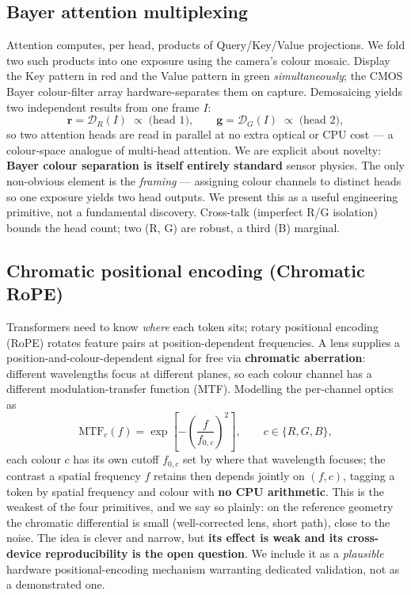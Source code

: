 \documentclass[11pt]{article}
\begin{document}
\subsection{Bayer attention multiplexing}
Attention computes, per head, products of Query/Key/Value projections. We fold two such
products into one exposure using the camera's colour mosaic. Display the Key pattern in red and
the Value pattern in green \emph{simultaneously}; the CMOS Bayer colour-filter array
hardware-separates them on capture. Demosaicing yields two independent results from one frame
$I$:
\begin{equation}
\mathbf{r} = \mathcal{D}_R(I)\;\propto\;\text{(head 1)}, \qquad
\mathbf{g} = \mathcal{D}_G(I)\;\propto\;\text{(head 2)},
\end{equation}
so two attention heads are read in parallel at no extra optical or CPU cost --- a colour-space
analogue of multi-head attention. We are explicit about novelty: \textbf{Bayer colour
separation is itself entirely standard} sensor physics. The only non-obvious element is the
\emph{framing} --- assigning colour channels to distinct heads so one exposure yields two head
outputs. We present this as a useful engineering primitive, not a fundamental discovery.
Cross-talk (imperfect R/G isolation) bounds the head count; two (R, G) are robust, a third (B)
marginal.

\subsection{Chromatic positional encoding (Chromatic RoPE)}
Transformers need to know \emph{where} each token sits; rotary positional encoding (RoPE)
rotates feature pairs at position-dependent frequencies. A lens supplies a
position-and-colour-dependent signal for free via \textbf{chromatic aberration}: different
wavelengths focus at different planes, so each colour channel has a different
modulation-transfer function (MTF). Modelling the per-channel optics as
\begin{equation}
\text{MTF}_c(f) = \exp\!\left[-\left(\frac{f}{f_{0,c}}\right)^2\right], \qquad c\in\{R,G,B\},
\end{equation}
each colour $c$ has its own cutoff $f_{0,c}$ set by where that wavelength focuses; the contrast
a spatial frequency $f$ retains then depends jointly on $(f,c)$, tagging a token by spatial
frequency and colour with \textbf{no CPU arithmetic}. This is the weakest of the four
primitives, and we say so plainly: on the reference geometry the chromatic differential is
small (well-corrected lens, short path), close to the noise. The idea is clever and narrow,
but \textbf{its effect is weak and its cross-device reproducibility is the open question}. We
include it as a \emph{plausible} hardware positional-encoding mechanism warranting dedicated
validation, not as a demonstrated one.
\end{document}
